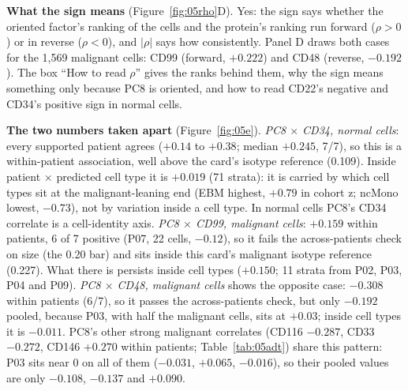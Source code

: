 \textbf{What the sign means} (Figure~\ref{fig:05rho}D). Yes: the sign says whether the oriented factor's ranking of the cells and the protein's ranking run forward ($\rho > 0$) or in reverse ($\rho < 0$), and $|\rho|$ says how consistently. Panel D draws both cases for the 1,569 malignant cells: CD99 (forward, $+0.222$) and CD48 (reverse, $-0.192$). The box ``How to read $\rho$'' gives the ranks behind them, why the sign means something only because PC8 is oriented, and how to read CD22's negative and CD34's positive sign in normal cells.

\textbf{The two numbers taken apart} (Figure~\ref{fig:05e}). \emph{PC8 $\times$ CD34, normal cells}: every supported patient agrees ($+0.14$ to $+0.38$; median $+0.245$, 7/7), so this is a within-patient association, well above the card's isotype reference (0.109). Inside patient $\times$ predicted cell type it is $+0.019$ (71 strata): it is carried by which cell types sit at the malignant-leaning end (EBM highest, $+0.79$ in cohort z; ncMono lowest, $-0.73$), not by variation inside a cell type. In normal cells PC8's CD34 correlate is a cell-identity axis. \emph{PC8 $\times$ CD99, malignant cells}: $+0.159$ within patients, 6 of 7 positive (P07, 22 cells, $-0.12$), so it fails the across-patients check on size (the 0.20 bar) and sits inside this card's malignant isotype reference (0.227). What there is persists inside cell types ($+0.150$; 11 strata from P02, P03, P04 and P09). \emph{PC8 $\times$ CD48, malignant cells} shows the opposite case: $-0.308$ within patients (6/7), so it passes the across-patients check, but only $-0.192$ pooled, because P03, with half the malignant cells, sits at $+0.03$; inside cell types it is $-0.011$. PC8's other strong malignant correlates (CD116 $-0.287$, CD33 $-0.272$, CD146 $+0.270$ within patients; Table~\ref{tab:05adt}) share this pattern: P03 sits near 0 on all of them ($-0.031$, $+0.065$, $-0.016$), so their pooled values are only $-0.108$, $-0.137$ and $+0.090$.

